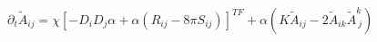 $\partial_t \tilde{A}_{ij} = \chi \left[ -D_i D_j \alpha + \alpha (R_{ij} - 8\pi S_{ij}) \right]^{TF} + \alpha (K \tilde{A}_{ij} - 2 \tilde{A}_{ik} \tilde{A}^k_{\ j})$
